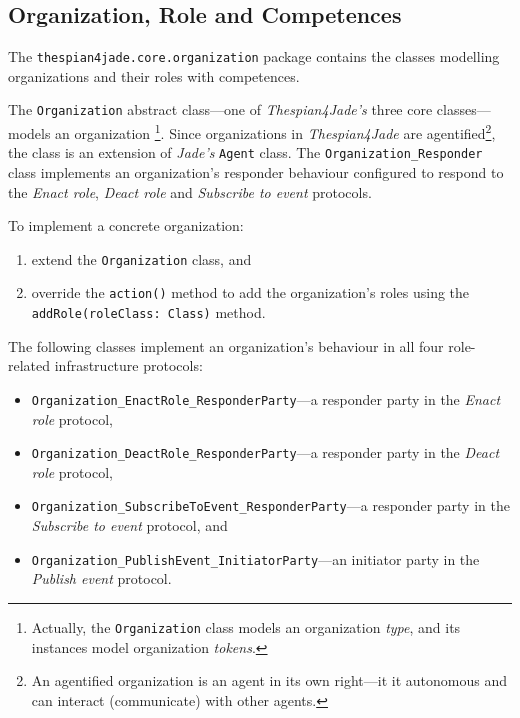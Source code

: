 \subsection{Organization, Role and Competences}

The \texttt{thespian4jade.core.organization} package contains the classes modelling organizations and their roles with competences.

The \texttt{Organization} abstract class---one of \textit{Thespian4Jade's} three core classes---models an organization
\footnote{Actually, the \texttt{Organization} class models an organization \textit{type}, and its instances model organization \textit{tokens}.}.
Since organizations in \textit{Thespian4Jade} are agentified\footnote{An agentified organization is an agent in its own right---it it autonomous and can interact (communicate) with other agents.}, the class is an extension of \textit{Jade's} \texttt{Agent} class.
The \texttt{Organization\_Responder} class implements an organization's responder behaviour configured to respond to the \textit{Enact role}, \textit{Deact role} and \textit{Subscribe to event} protocols.

To implement a concrete organization:
\begin{enumerate}
	\item extend the \texttt{Organization} class, and
	\item override the \texttt{action()} method to add the organization's roles using the \texttt{addRole(roleClass: Class)} method.
\end{enumerate}

The following classes implement an organization's behaviour in all four role-related infrastructure protocols:
\begin{itemize}
	\item \texttt{Organization\_EnactRole\_ResponderParty}---a responder party in the \textit{Enact role} protocol,
	\item \texttt{Organization\_DeactRole\_ResponderParty}---a responder party in the \textit{Deact role} protocol,
	\item \texttt{Organization\_SubscribeToEvent\_ResponderParty}---a responder party in the \textit{Subscribe to event} protocol, and
	\item \texttt{Organization\_PublishEvent\_InitiatorParty}---an initiator party in the \textit{Publish event} protocol.
\end{itemize}


